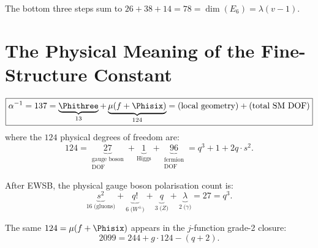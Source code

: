 The bottom three steps sum to $26+38+14 = 78 = \dim(E_6) = \lambda(v{-}1)$.


\section{The Physical Meaning of the Fine-Structure Constant}
\label{sec:alpha-meaning}

\begin{theorem}
\label{thm:alpha-dof}
\begin{equation}
\boxed{\alpha^{-1} = 137 = \underbrace{\Phithree}_{13} +
\underbrace{\mu(f+\Phisix)}_{124} =
\text{(local geometry)} + \text{(total SM DOF)}}
\end{equation}
where the $124$ physical degrees of freedom are:
\begin{equation}
124 = \underbrace{27}_{\substack{\text{gauge boson}\\\text{DOF}}} +
\underbrace{1}_{\text{Higgs}} +
\underbrace{96}_{\substack{\text{fermion}\\\text{DOF}}}
= q^3 + 1 + 2q\cdot s^2.
\end{equation}
\end{theorem}

\begin{theorem}[Gauge Boson DOF $= q^3 = \dim(E_6\text{ fund.})$]
After EWSB, the physical gauge boson polarisation count is:
\begin{equation}
\underbrace{s^2}_{16\;\text{(gluons)}} +
\underbrace{q!}_{6\;\text{($W^\pm$)}} +
\underbrace{q}_{3\;\text{($Z$)}} +
\underbrace{\lambda}_{2\;\text{($\gamma$)}} = 27 = q^3.
\end{equation}
\end{theorem}

\begin{corollary}
The same $124 = \mu(f+\Phisix)$ appears in the $j$-function grade-2 closure:
\begin{equation}
2099 = 244 + g\cdot 124 - (q+2).
\end{equation}
\end{corollary}
